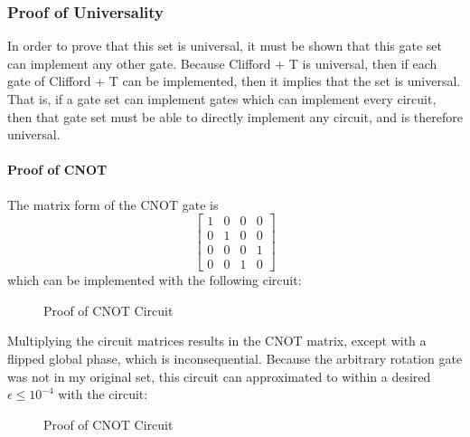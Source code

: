 \documentclass[12pt]{article}
\begin{document}
\subsubsection{Proof of Universality}
In order to prove that this set is universal, it must be shown that this gate set can implement any other gate. Because Clifford + T is universal, then if each gate of Clifford + T can be implemented, then it implies that the set is universal. That is, if a gate set can implement gates which can implement every circuit, then that gate set must be able to directly implement any circuit, and is therefore universal.

\paragraph{Proof of CNOT}
The matrix form of the CNOT gate is
$$
\begin{bmatrix}
    1&0&0&0\\
    0&1&0&0\\
    0&0&0&1\\
    0&0&1&0
\end{bmatrix}
$$
which can be implemented with the following circuit:
\begin{figure}[h]
    \centering
    \caption{Proof of CNOT Circuit}
    \label{fig:quantum universal set 1 proof of CNOT circuit algebraic}
\end{figure}

Multiplying the circuit matrices results in the CNOT matrix, except with a flipped global phase, which is inconsequential. Because the arbitrary rotation gate was not in my original set, this circuit can approximated to within a desired $\epsilon \le 10^{-4}$ with the circuit:

\begin{figure}[h]
    \centering
    \caption{Proof of CNOT Circuit}
    \label{fig:quantum universal set 1 proof of CNOT circuit numerical}
\end{figure}
\end{document}
